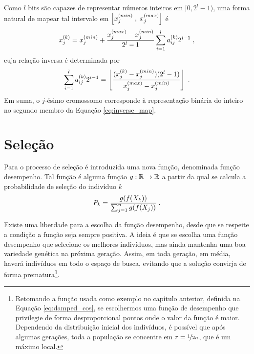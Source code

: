 Como $l$ bits são capazes de representar números inteiros em $ [0, 2^l - 1) $,
uma forma natural de mapear tal intervalo
em $ \left[ x^{(min)}_{j} \; , \; x^{(max)}_{j} \right] $ é
\begin{equation}
  x^{(k)}_j = x^{(min)}_{j} + \frac{x^{(max)}_{j} - x^{(min)}_{j}}{2^l - 1} \sum_{i = 1}^l {a}^{(k)}_{ij} 2^{i - 1} \;\mathrm{,}
\end{equation}
cuja relação inversa é determinada por
\begin{equation}
  \sum_{i = 1}^l {a}^{(k)}_{ij} 2^{i - 1} =
  \left\lfloor \frac{({x}^{(k)}_{j} - x^{(min)}_{j})(2^l - 1)}{x^{(max)}_{j} - x^{(min)}_{j}} \right\rfloor
  \;\mathrm{.}
  \label{eq:inverse_map}
\end{equation}
Em suma, o $j$-ésimo cromossomo corresponde à representação binária do inteiro no segundo
membro da Equação \ref{eq:inverse_map}.
\section{Seleção}

Para o processo de seleção é introduzida uma nova função, denominada função desempenho.
Tal função é alguma função $ g : \mathbb{R} \rightarrow \mathbb{R} $ a partir da qual se calcula a probabilidade
de seleção do indivíduo $k$
\begin{equation}
  P_k = \frac{g(f(X_k))}{\sum_{j = 1}^n g(f(X_j))} \;\mathrm{.}
\end{equation}

Existe uma liberdade para a escolha da função desempenho, desde que se respeite a condição a
função seja sempre positiva. A ideia é que se escolha uma função desempenho que
selecione os melhores indivíduos, mas ainda mantenha uma boa variedade genética na
próxima geração. Assim, em toda geração, em média, haverá indivíduos em todo o espaço
de busca, evitando que a solução convirja de forma prematura\footnote{
  Retomando a função usada como exemplo no capítulo anterior, definida na Equação
  \ref{eq:damped_cos}, se escolhermos uma função de desempenho que privilegie
  de forma desproporcional pontos onde o valor da função é maior. Dependendo da
  distribuição inicial dos indivíduos, é possível que após algumas gerações,
  toda a população se concentre em $ r = \nicefrac{1}{2n} $, que é um
  máximo local.
}.

\newcommand{\fmin}{f_{min}}
\newcommand{\fmax}{f_{max}}

